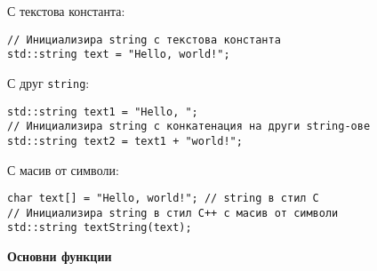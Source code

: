 \documentclass[oneside]{book}
\newcommand*{\code}[1]{\texttt{#1}}
\begin{document}
С текстова константа:
\vspace{-4pt}\begin{mdframed}\begin{lstlisting}
// Инициализира string с текстова константа
std::string text = "Hello, world!";
\end{lstlisting}\end{mdframed}

С друг \code{string}:
\vspace{-4pt}\begin{mdframed}\begin{lstlisting}
std::string text1 = "Hello, ";
// Инициализира string с конкатенация на други string-ове
std::string text2 = text1 + "world!";
\end{lstlisting}\end{mdframed}

С масив от символи:
\vspace{-4pt}\begin{mdframed}\begin{lstlisting}
char text[] = "Hello, world!"; // string в стил C
// Инициализира string в стил C++ с масив от символи
std::string textString(text);
\end{lstlisting}\end{mdframed}

\begin{center}\textbf{Основни функции}\end{center}
\end{document}
